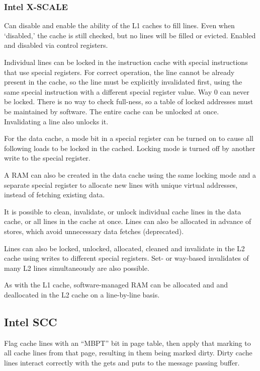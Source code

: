 \subsubsection{Intel X-SCALE}

Can disable and enable the ability of the L1 caches to fill lines. Even when `disabled,' the cache is still checked, but no lines will be filled or evicted. Enabled and disabled via control registers.

Individual lines can be locked in the instruction cache with special instructions that use special registers. For correct operation, the line cannot be already present in the cache, so the line must be explicitly invalidated first, using the same special instruction with a different special register value. Way 0 can never be locked. There is no way to check full-ness, so a table of locked addresses must be maintained by software. The entire cache can be unlocked at once. Invalidating a line also unlocks it.

For the data cache, a mode bit in a special register can be turned on to cause all following loads to be locked in the cached. Locking mode is turned off by another write to the special register.

A RAM can also be created in the data cache using the same locking mode and a separate special register to allocate new lines with unique virtual addresses, instead of fetching existing data.

It is possible to clean, invalidate, or unlock individual cache lines in the data cache, or all lines in the cache at once. Lines can also be allocated in advance of stores, which avoid unnecessary data fetches (deprecated).

Lines can also be locked, unlocked, allocated, cleaned and invalidate in the L2 cache using writes to different special registers. Set- or way-based invalidates of many L2 lines simultaneously are also possible.

As with the L1 cache, software-managed RAM can be allocated and  and deallocated in the L2 cache on a line-by-line basis.

\subsection{Intel SCC}

Flag cache lines with an ``MBPT'' bit in page table, then apply that marking to all cache lines from that page, resulting in them being marked dirty. Dirty cache lines interact correctly with the gets and puts to the message passing buffer.

